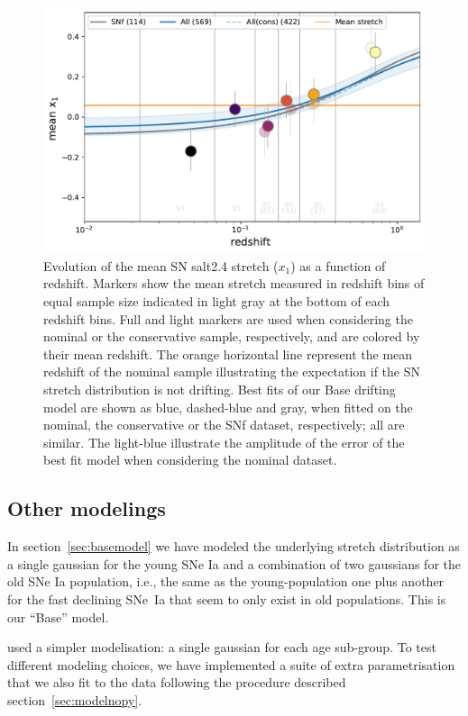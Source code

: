 \documentclass[]{aa} %
\newcommand{\nn}[1]{{\textcolor[rgb]{1, 0.27, 0}{#1}}}
\begin{document}
\begin{figure}
    \centering
    \includegraphics[width=0.7\linewidth]{Article_figures/stretchevol_all_vs_snf.pdf}
    \caption{Evolution of the mean SN salt2.4 stretch ($x_1$) as a function of
        redshift.  Markers show the mean stretch measured in redshift bins of
        equal sample size indicated in light gray at the bottom of each redshift
        bins. Full and light markers are used when considering the nominal or
        the conservative sample, respectively, and are colored by their mean
        redshift.  The orange horizontal line represent the mean redshift of the
    nominal sample illustrating the expectation if the SN stretch distribution
is not drifting. Best fits of our Base drifting model are shown as blue,
dashed-blue and gray, when fitted on the nominal, the conservative or the SNf
dataset, respectively; all are similar. The light-blue illustrate the amplitude
of the error of the best fit model when considering the nominal dataset.}
    \label{fig:modelall}
\end{figure}

\subsection{Other modelings}
\label{sec:othermodel}

In section~\nn{\ref{sec:basemodel}} we have modeled the underlying stretch
distribution as a single gaussian for the young SNe Ia and a combination of two
gaussians for the old SNe Ia population, i.e., the same as the young-population
one plus another for the fast declining SNe~Ia that seem to only exist in old
populations. This is our “Base” model.

\cite{howell2007} used a simpler modelisation: a single gaussian for each age
sub-group. To test \nn{different modeling choices}, we have implemented a suite
of extra parametrisation that we also fit to the data following the procedure
described section~\ref{sec:modelnopy}. 
\end{document}
